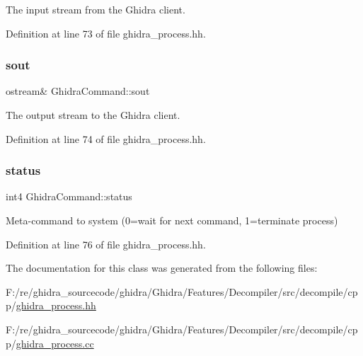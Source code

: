 The input stream from the Ghidra client. 



Definition at line 73 of file ghidra\+\_\+process.\+hh.

\mbox{\label{class_ghidra_command_ad69e547a2a9f0f86f9a56679db28d615}} 
\subsubsection{\texorpdfstring{sout}{sout}}
{\footnotesize\ttfamily ostream\& Ghidra\+Command\+::sout\hspace{0.3cm}{\ttfamily [protected]}}



The output stream to the Ghidra client. 



Definition at line 74 of file ghidra\+\_\+process.\+hh.

\mbox{\label{class_ghidra_command_a70cceb418d76ef01a922d3a01ccc76a6}} 
\subsubsection{\texorpdfstring{status}{status}}
{\footnotesize\ttfamily int4 Ghidra\+Command\+::status\hspace{0.3cm}{\ttfamily [protected]}}



Meta-\/command to system (0=wait for next command, 1=terminate process) 



Definition at line 76 of file ghidra\+\_\+process.\+hh.



The documentation for this class was generated from the following files\+:\begin{DoxyCompactItemize}
\item 
F\+:/re/ghidra\+\_\+sourcecode/ghidra/\+Ghidra/\+Features/\+Decompiler/src/decompile/cpp/\mbox{\hyperlink{ghidra__process_8hh}{ghidra\+\_\+process.\+hh}}\item 
F\+:/re/ghidra\+\_\+sourcecode/ghidra/\+Ghidra/\+Features/\+Decompiler/src/decompile/cpp/\mbox{\hyperlink{ghidra__process_8cc}{ghidra\+\_\+process.\+cc}}\end{DoxyCompactItemize}
